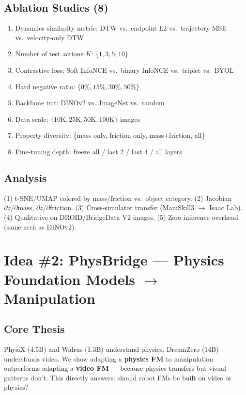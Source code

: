 \documentclass[11pt,a4paper]{article}
\begin{document}
\subsection{Ablation Studies (8)}
\begin{enumerate}[nosep]
\item Dynamics similarity metric: DTW vs.\ endpoint L2 vs.\ trajectory MSE vs.\ velocity-only DTW
\item Number of test actions $K$: $\{1,3,5,10\}$
\item Contrastive loss: Soft InfoNCE vs.\ binary InfoNCE vs.\ triplet vs.\ BYOL
\item Hard negative ratio: $\{0\%, 15\%, 30\%, 50\%\}$
\item Backbone init: DINOv2 vs.\ ImageNet vs.\ random
\item Data scale: $\{10\text{K}, 25\text{K}, 50\text{K}, 100\text{K}\}$ images
\item Property diversity: \{mass only, friction only, mass+friction, all\}
\item Fine-tuning depth: freeze all / last 2 / last 4 / all layers
\end{enumerate}

\subsection{Analysis}
(1) t-SNE/UMAP colored by mass/friction vs.\ object category. (2) Jacobian $\partial z/\partial \text{mass}$, $\partial z/\partial \text{friction}$. (3) Cross-simulator transfer (ManiSkill3 $\to$ Isaac Lab). (4) Qualitative on DROID/BridgeData V2 images. (5) Zero inference overhead (same arch as DINOv2).

\newpage
\section{Idea \#2: PhysBridge --- Physics Foundation Models $\to$ Manipulation}
\label{sec:physbridge}

\subsection{Core Thesis}

PhysiX (4.5B) and Walrus (1.3B) understand physics. DreamZero (14B) understands video. We show adapting a \textbf{physics FM} to manipulation outperforms adapting a \textbf{video FM} --- because physics transfers but visual patterns don't. This directly answers: should robot FMs be built on video or physics?
\end{document}
